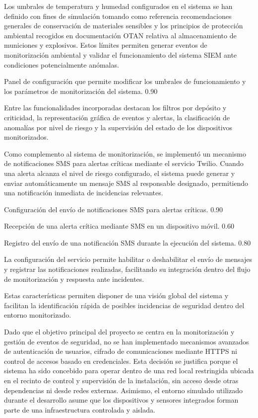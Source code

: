 Los umbrales de temperatura y humedad configurados en el sistema se han definido con fines de simulación tomando como referencia recomendaciones generales de conservación de materiales sensibles y los principios de protección ambiental recogidos en documentación OTAN relativa al almacenamiento de municiones y explosivos. Estos límites permiten generar eventos de monitorización ambiental y validar el funcionamiento del sistema SIEM ante condiciones potencialmente anómalas.


{Panel de configuración que permite modificar los umbrales de funcionamiento y los parámetros de monitorización del sistema.}
{0.90}

Entre las funcionalidades incorporadas destacan los filtros por depósito y criticidad, la representación gráfica de eventos y alertas, la clasificación de anomalías por nivel de riesgo y la supervisión del estado de los dispositivos monitorizados.

Como complemento al sistema de monitorización, se implementó un mecanismo de notificaciones SMS para alertas críticas mediante el servicio Twilio. Cuando una alerta alcanza el nivel de riesgo configurado, el sistema puede generar y enviar automáticamente un mensaje SMS al responsable designado, permitiendo una notificación inmediata de incidencias relevantes.

{Configuración del envío de notificaciones SMS para alertas críticas.}
{0.90}

{Recepción de una alerta crítica mediante SMS en un dispositivo móvil.}
{0.60}

{Registro del envío de una notificación SMS durante la ejecución del sistema.}
{0.80}

La configuración del servicio permite habilitar o deshabilitar el envío de mensajes y registrar las notificaciones realizadas, facilitando su integración dentro del flujo de monitorización y respuesta ante incidentes.

Estas características permiten disponer de una visión global del sistema y facilitan la identificación rápida de posibles incidencias de seguridad dentro del entorno monitorizado.

Dado que el objetivo principal del proyecto se centra en la monitorización y gestión de eventos de seguridad, no se han implementado mecanismos avanzados de autenticación de usuarios, cifrado de comunicaciones mediante HTTPS ni control de accesos basado en credenciales. Esta decisión se justifica porque el sistema ha sido concebido para operar dentro de una red local restringida ubicada en el recinto de control y supervisión de la instalación, sin acceso desde otras dependencias ni desde redes externas. Asimismo, el entorno simulado utilizado durante el desarrollo asume que los dispositivos y sensores integrados forman parte de una infraestructura controlada y aislada.


